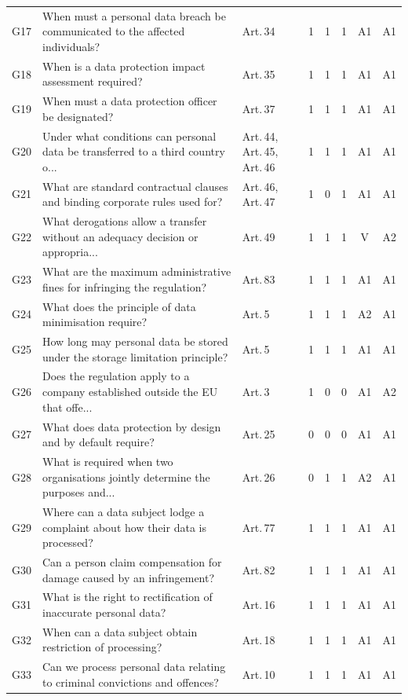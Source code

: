 \begin{tabular}{@{}llp{3.1cm}cccc c@{}}
G17 & When must a personal data breach be communicated to the affected individuals? & Art.\,34 & 1 & 1 & 1 & A1 & A1 \\
G18 & When is a data protection impact assessment required? & Art.\,35 & 1 & 1 & 1 & A1 & A1 \\
G19 & When must a data protection officer be designated? & Art.\,37 & 1 & 1 & 1 & A1 & A1 \\
G20 & Under what conditions can personal data be transferred to a third country o... & Art.\,44, Art.\,45, Art.\,46 & 1 & 1 & 1 & A1 & A1 \\
G21 & What are standard contractual clauses and binding corporate rules used for? & Art.\,46, Art.\,47 & 1 & 0 & 1 & A1 & A1 \\
G22 & What derogations allow a transfer without an adequacy decision or appropria... & Art.\,49 & 1 & 1 & 1 & V & A2 \\
G23 & What are the maximum administrative fines for infringing the regulation? & Art.\,83 & 1 & 1 & 1 & A1 & A1 \\
G24 & What does the principle of data minimisation require? & Art.\,5 & 1 & 1 & 1 & A2 & A1 \\
G25 & How long may personal data be stored under the storage limitation principle? & Art.\,5 & 1 & 1 & 1 & A1 & A1 \\
G26 & Does the regulation apply to a company established outside the EU that offe... & Art.\,3 & 1 & 0 & 0 & A1 & A2 \\
G27 & What does data protection by design and by default require? & Art.\,25 & 0 & 0 & 0 & A1 & A1 \\
G28 & What is required when two organisations jointly determine the purposes and... & Art.\,26 & 0 & 1 & 1 & A2 & A1 \\
G29 & Where can a data subject lodge a complaint about how their data is processed? & Art.\,77 & 1 & 1 & 1 & A1 & A1 \\
G30 & Can a person claim compensation for damage caused by an infringement? & Art.\,82 & 1 & 1 & 1 & A1 & A1 \\
G31 & What is the right to rectification of inaccurate personal data? & Art.\,16 & 1 & 1 & 1 & A1 & A1 \\
G32 & When can a data subject obtain restriction of processing? & Art.\,18 & 1 & 1 & 1 & A1 & A1 \\
G33 & Can we process personal data relating to criminal convictions and offences? & Art.\,10 & 1 & 1 & 1 & A1 & A1 \\

\end{tabular}
